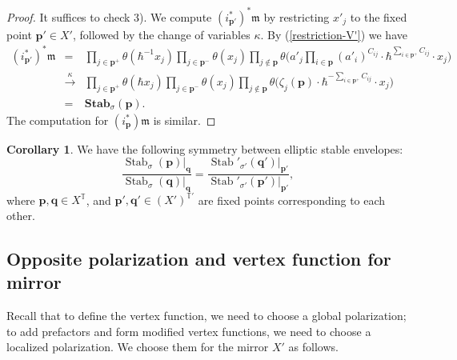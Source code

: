 \documentclass[10pt]{amsart}
\theoremstyle{definition}
\def\ben{\begin{eqnarray*}}
\def\een{\end{eqnarray*}}
\def\TT{\mathbb{T}}
\newcommand{\bp}{\mathbf{p}}
\newcommand{\bq}{\mathbf{q}}
\newcommand{\bStab}{\mathbf{Stab}}
\newcommand{\Stab}{\operatorname{Stab}}
\theoremstyle{definition}
\numberwithin{equation}{section}
\theoremstyle{Theorem}
\newtheorem{Corollary}[Definition]{Corollary}
\begin{document}
\begin{proof}
It suffices to check 3). We compute $(i_{\bp'}^*)^* \mathfrak{m}$ by restricting $x'_j$ to the fixed point $\bp' \in X'$, followed by the change of variables $\kappa$. By (\ref{restriction-V'}) we have
\ben
(i_{\bp'}^*)^* \mathfrak{m} &=& \prod_{j\in \bp^+} \theta (\hbar^{-1} x_j) \prod_{j\in \bp^-} \theta (x_j) \prod_{j\not\in \bp} \theta \Big( a'_j \prod_{i \in \bp} (a'_i)^{C_{ij}} \cdot \hbar^{\sum_{i\in \bp^+} C_{ij} } \cdot  x_j  \Big) \\
&\xrightarrow{\kappa}& \prod_{j\in \bp^+} \theta (\hbar x_j) \prod_{j\in \bp^-} \theta ( x_j) \prod_{j\not\in \bp} \theta \Big( \zeta_j (\bp) \cdot \hbar^{ - \sum_{i\in \bp^+} C_{ij} } \cdot  x_j  \Big) \\
&=& \bStab_\sigma (\bp).
\een
The computation for $(i_\bp^*) \mathfrak{m}$ is similar.
\end{proof}

\begin{Corollary} \label{Cor-Stab}
We have the following symmetry between elliptic stable envelopes:
$$
\frac{\Stab_\sigma (\bp) |_\bq }{\Stab_\sigma (\bq) |_\bq } = \frac{\Stab'_{\sigma'} (\bq') |_{\bp'}}{\Stab'_{\sigma'} (\bp') |_{\bp'}},
$$
where $\bp, \bq \in X^\TT$, and $\bp', \bq' \in (X')^{\TT'}$ are fixed points corresponding to each other.
\end{Corollary}





\subsection{Opposite polarization and vertex function for mirror} \label{oppo}

Recall that to define the vertex function, we need to choose a global polarization; to add prefactors and form modified vertex functions, we need to choose a localized polarization. We choose them for the mirror $X'$ as follows.
\end{document}
